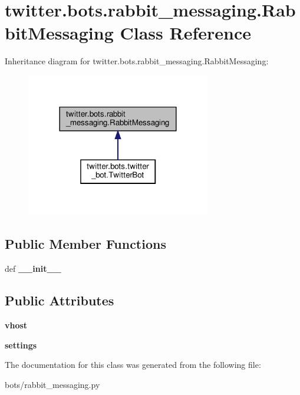 \hypertarget{classtwitter_1_1bots_1_1rabbit__messaging_1_1RabbitMessaging}{}\section{twitter.\+bots.\+rabbit\+\_\+messaging.\+Rabbit\+Messaging Class Reference}
\label{classtwitter_1_1bots_1_1rabbit__messaging_1_1RabbitMessaging}


Inheritance diagram for twitter.\+bots.\+rabbit\+\_\+messaging.\+Rabbit\+Messaging\+:\nopagebreak
\begin{figure}[H]
\begin{center}
\leavevmode
\includegraphics[width=228pt]{classtwitter_1_1bots_1_1rabbit__messaging_1_1RabbitMessaging__inherit__graph}
\end{center}
\end{figure}
\subsection*{Public Member Functions}
\begin{DoxyCompactItemize}
\item 
\mbox{\label{classtwitter_1_1bots_1_1rabbit__messaging_1_1RabbitMessaging_a34c66d4ac88da28a2bd316ff79edf262}} 
def {\bfseries \+\_\+\+\_\+init\+\_\+\+\_\+}
\end{DoxyCompactItemize}
\subsection*{Public Attributes}
\begin{DoxyCompactItemize}
\item 
\mbox{\label{classtwitter_1_1bots_1_1rabbit__messaging_1_1RabbitMessaging_a191a98366932a439235d21008d942267}} 
{\bfseries vhost}
\item 
\mbox{\label{classtwitter_1_1bots_1_1rabbit__messaging_1_1RabbitMessaging_a6b30781862012f4ca02c57b581e4561f}} 
{\bfseries settings}
\end{DoxyCompactItemize}


The documentation for this class was generated from the following file\+:\begin{DoxyCompactItemize}
\item 
bots/rabbit\+\_\+messaging.\+py\end{DoxyCompactItemize}
